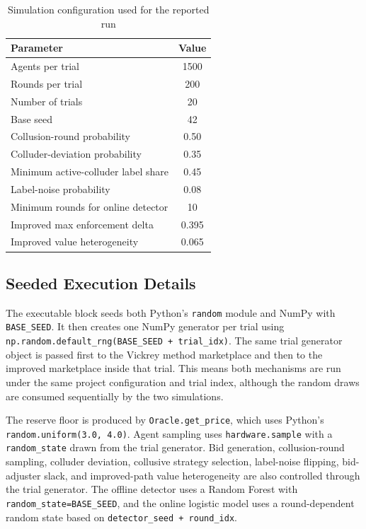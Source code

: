 \documentclass[conference]{IEEEtran}
\begin{document}
\begin{table}[htbp]
\caption{Simulation configuration used for the reported run}
\label{tab:params}
\centering
\begin{tabular}{lc}
\toprule
\textbf{Parameter} & \textbf{Value} \\
\midrule
Agents per trial & 1500 \\
Rounds per trial & 200 \\
Number of trials & 20 \\
Base seed & 42 \\
Collusion-round probability & 0.50 \\
Colluder-deviation probability & 0.35 \\
Minimum active-colluder label share & 0.45 \\
Label-noise probability & 0.08 \\
Minimum rounds for online detector & 10 \\
Improved max enforcement delta & 0.395 \\
Improved value heterogeneity & 0.065 \\
\bottomrule
\end{tabular}
\end{table}

\subsection{Seeded Execution Details}
The executable block seeds both Python's \texttt{random} module and NumPy with \texttt{BASE\_SEED}. It then creates one NumPy generator per trial using \texttt{np.random.default\_rng(BASE\_SEED + trial\_idx)}. The same trial generator object is passed first to the Vickrey method marketplace and then to the improved marketplace inside that trial. This means both mechanisms are run under the same project configuration and trial index, although the random draws are consumed sequentially by the two simulations.

The reserve floor is produced by \texttt{Oracle.get\_price}, which uses Python's \texttt{random.uniform(3.0, 4.0)}. Agent sampling uses \texttt{hardware.sample} with a \texttt{random\_state} drawn from the trial generator. Bid generation, collusion-round sampling, colluder deviation, collusive strategy selection, label-noise flipping, bid-adjuster slack, and improved-path value heterogeneity are also controlled through the trial generator. The offline detector uses a Random Forest with \texttt{random\_state=BASE\_SEED}, and the online logistic model uses a round-dependent random state based on \texttt{detector\_seed + round\_idx}.
\end{document}
